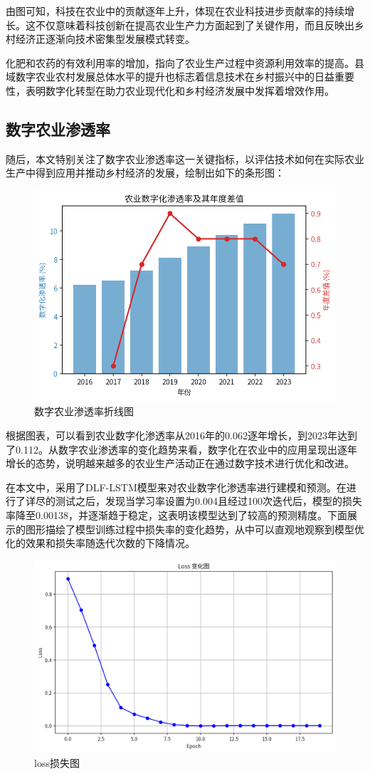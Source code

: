 由图可知，科技在农业中的贡献逐年上升，体现在农业科技进步贡献率的持续增长。这不仅意味着科技创新在提高农业生产力方面起到了关键作用，而且反映出乡村经济正逐渐向技术密集型发展模式转变。

化肥和农药的有效利用率的增加，指向了农业生产过程中资源利用效率的提高。县域数字农业农村发展总体水平的提升也标志着信息技术在乡村振兴中的日益重要性，表明数字化转型在助力农业现代化和乡村经济发展中发挥着增效作用。
\subsection{数字农业渗透率}
随后，本文特别关注了数字农业渗透率这一关键指标，以评估技术如何在实际农业生产中得到应用并推动乡村经济的发展，绘制出如下的条形图\cite{china-digital-inclusion-development-report-2022}：

\begin{figure}[H]
    \centering
    \includegraphics[width=0.6\linewidth]{figures/image1.png}
    \caption{数字农业渗透率折线图}
    \label{fig:Digital_agriculture_penetration}
\end{figure}

根据图表，可以看到农业数字化渗透率从2016年的0.062逐年增长，到2023年达到了0.112。从数字农业渗透率的变化趋势来看，数字化在农业中的应用呈现出逐年增长的态势，说明越来越多的农业生产活动正在通过数字技术进行优化和改进。

在本文中，采用了DLF-LSTM模型来对农业数字化渗透率进行建模和预测。在进行了详尽的测试之后，发现当学习率设置为0.004且经过100次迭代后，模型的损失率降至0.00138，并逐渐趋于稳定，这表明该模型达到了较高的预测精度。下面展示的图形描绘了模型训练过程中损失率的变化趋势，从中可以直观地观察到模型优化的效果和损失率随迭代次数的下降情况。

\begin{figure}[H]
    \centering
    \includegraphics[width=0.65\linewidth]{figures/45.png}
    \caption{loss损失图}
    \label{fig:enter-label}
\end{figure}


